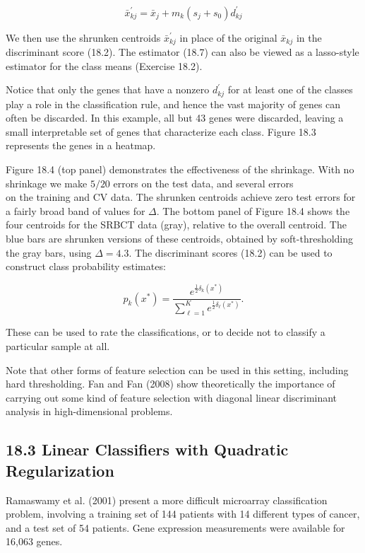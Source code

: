 \documentclass[10pt]{article}
\begin{document}
\begin{equation*}
\bar{x}_{k j}^{\prime}=\bar{x}_{j}+m_{k}\left(s_{j}+s_{0}\right) d_{k j}^{\prime} \tag{18.7}
\end{equation*}


We then use the shrunken centroids $\bar{x}_{k j}^{\prime}$ in place of the original $\bar{x}_{k j}$ in the discriminant score (18.2). The estimator (18.7) can also be viewed as a lasso-style estimator for the class means (Exercise 18.2).

Notice that only the genes that have a nonzero $d_{k j}^{\prime}$ for at least one of the classes play a role in the classification rule, and hence the vast majority of genes can often be discarded. In this example, all but 43 genes were discarded, leaving a small interpretable set of genes that characterize each class. Figure 18.3 represents the genes in a heatmap.

Figure 18.4 (top panel) demonstrates the effectiveness of the shrinkage. With no shrinkage we make $5 / 20$ errors on the test data, and several errors\\
on the training and CV data. The shrunken centroids achieve zero test errors for a fairly broad band of values for $\Delta$. The bottom panel of Figure 18.4 shows the four centroids for the SRBCT data (gray), relative to the overall centroid. The blue bars are shrunken versions of these centroids, obtained by soft-thresholding the gray bars, using $\Delta=4.3$. The discriminant scores (18.2) can be used to construct class probability estimates:


\begin{equation*}
\hat{p}_{k}\left(x^{*}\right)=\frac{e^{\frac{1}{2} \delta_{k}\left(x^{*}\right)}}{\sum_{\ell=1}^{K} e^{\frac{1}{2} \delta_{\ell}\left(x^{*}\right)}} . \tag{18.8}
\end{equation*}


These can be used to rate the classifications, or to decide not to classify a particular sample at all.

Note that other forms of feature selection can be used in this setting, including hard thresholding. Fan and Fan (2008) show theoretically the importance of carrying out some kind of feature selection with diagonal linear discriminant analysis in high-dimensional problems.

\subsection*{18.3 Linear Classifiers with Quadratic Regularization}
Ramaswamy et al. (2001) present a more difficult microarray classification problem, involving a training set of 144 patients with 14 different types of cancer, and a test set of 54 patients. Gene expression measurements were available for 16,063 genes.
\end{document}
